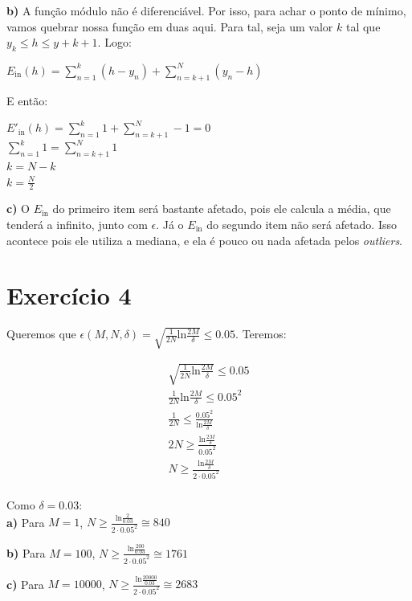 \documentclass[12pt,letterpaper]{article}
\begin{document}
	\textbf{b)} A função módulo não é diferenciável. Por isso, para achar o ponto de mínimo, vamos quebrar nossa função em duas aqui. Para tal, seja um valor $ k $ tal que $ y_k \leq h \leq y+{k+1} $. Logo:
	
	\begin{center} 
		$E_{\text{in}}(h) = \sum_{n=1}^{k} (h-y_n) +  \sum_{n=k+1}^{N} (y_n-h) $\\
	\end{center}
	
	E então:
	
	\begin{center} 
		$E'_{\text{in}}(h) = \sum_{n=1}^{k} 1 +  \sum_{n=k+1}^{N} -1 = 0$\\
		$ \sum_{n=1}^{k} 1 = \sum_{n=k+1}^{N} 1 $\\
		$k = N-k$ \\
		$k = \frac{N}{2}$
	\end{center}
	
	\textbf{c)} O $E_{\text{in}}$ do primeiro item será bastante afetado, pois ele calcula a média, que tenderá a infinito, junto com $ \epsilon $. Já o $ E_\text{in} $ do segundo item não será afetado. Isso acontece pois ele utiliza a mediana, e ela é pouco ou nada afetada pelos \textit{outliers}.
	
	\section*{Exercício 4}
	
	Queremos que $\epsilon(M, N, \delta) = \sqrt{\frac{1}{2N} \text{ln} \frac{2M}{\delta}} \leq 0.05$. Teremos:
	
	\clearpage
	
	\begin{multicols}{2}
		\begin{equation*}
			\begin{split}
				\sqrt{\frac{1}{2N} \text{ln} \frac{2M}{\delta}} \leq 0.05 \\
				\frac{1}{2N} \text{ln} \frac{2M}{\delta} \leq 0.05^2 \\
				\frac{1}{2N} \leq \frac{0.05^2}{\text{ln} \frac{2M}{\delta}} \\
				2N \geq \frac{\text{ln} \frac{2M}{\delta}}{0.05^2} \\
				N \geq \frac{\text{ln} \frac{2M}{\delta}}{2 \cdot 0.05^2} \\
			\end{split}
		\end{equation*}
		
		Como $\delta = 0.03$: \\
		
		\textbf{a)} Para $M = 1$, $N \geq \frac{\text{ln} \frac{2}{0.03}}{2 \cdot 0.05^2} \cong 840$
		
		\textbf{b)} Para $M = 100$, $N \geq \frac{\text{ln} \frac{200}{0.03}}{2 \cdot 0.05^2} \cong 1761$
		
		\textbf{c)} Para $M = 10000$, $N \geq \frac{\text{ln} \frac{20000}{0.03}}{2 \cdot 0.05^2} \cong 2683$
	\end{multicols}
	
\end{document}
